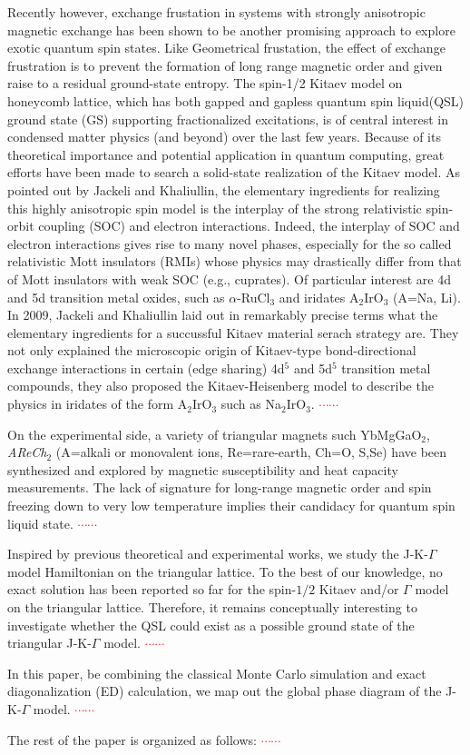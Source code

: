 \documentclass[aps,prb,reprint,groupedaddress,showpacs,amsfonts,amsmath,amssymb,superscriptaddress]{revtex4-1}
\begin{document}
Recently however, exchange frustation in systems with strongly anisotropic magnetic exchange has been shown to be another promising approach to explore exotic quantum spin states. Like Geometrical frustation, the effect of exchange frustration is to prevent the formation of long range magnetic order and given raise to a residual ground-state entropy. The spin-1/2 Kitaev model on honeycomb lattice, which has both gapped and gapless quantum spin liquid(QSL) ground state (GS) supporting fractionalized excitations, is of central interest in condensed matter physics (and beyond) over the last few years. Because of its theoretical importance and potential application in quantum computing, great efforts have been made to search a solid-state realization of the Kitaev model. As pointed out by Jackeli and Khaliullin, the elementary ingredients for realizing this highly anisotropic spin model is the interplay of the strong relativistic spin-orbit coupling (SOC) and electron interactions. Indeed, the interplay of SOC and electron interactions gives rise to many novel phases, especially for the so called relativistic Mott insulators (RMIs) whose physics may drastically differ from that of Mott insulators with weak SOC (e.g., cuprates). Of particular interest are 4d and 5d transition metal oxides, such as $\alpha$-RuCl$_3$ and iridates A$_2$IrO$_3$ (A=Na, Li).
In 2009, Jackeli and Khaliullin laid out in remarkably precise terms what the elementary ingredients for a succussful Kitaev material serach strategy are. They not only explained the microscopic origin of Kitaev-type bond-directional exchange interactions in certain (edge sharing) 4d$^5$ and 5d$^5$ transition metal compounds, they also proposed the Kitaev-Heisenberg model to describe the physics in iridates of the form A$_2$IrO$_3$ such as Na$_2$IrO$_3$.
\textcolor{red}{$\cdots\cdots$}

On the experimental side, a variety of triangular magnets such YbMgGaO$_2$, \emph{AReCh}$_2$ (A=alkali or monovalent ions, Re=rare-earth, Ch=O, S,Se) have been synthesized and explored by magnetic susceptibility and heat capacity measurements. The lack of signature for long-range magnetic order and spin freezing down to very low temperature implies their candidacy for quantum spin liquid state. \textcolor{red}{$\cdots\cdots$}

Inspired by previous theoretical and experimental works, we study the J-K-$\Gamma$ model Hamiltonian on the triangular lattice. To the best of our knowledge, no exact solution has been reported so far for the spin-$1/2$ Kitaev and/or $\Gamma$ model on the triangular lattice. Therefore, it remains conceptually interesting to investigate whether the QSL could exist as a possible ground state of the triangular J-K-$\Gamma$ model. \textcolor{red}{$\cdots\cdots$}

In this paper, be combining the classical Monte Carlo simulation and exact diagonalization (ED) calculation, we map out the global phase diagram of the J-K-$\Gamma$ model. \textcolor{red}{$\cdots\cdots$}

The rest of the paper is organized as follows: \textcolor{red}{$\cdots\cdots$}
\end{document}
